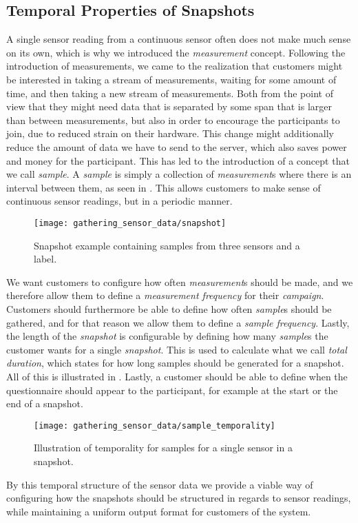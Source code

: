 \subsection{Temporal Properties of Snapshots}
\label{sec:temporal_properties_of_snapshots}

A single sensor reading from a continuous sensor often does not make much sense on its own, which is why we introduced the \emph{measurement} concept. Following the introduction of measurements, we came to the realization that customers might be interested in taking a stream of measurements, waiting for some amount of time, and then taking a new stream of measurements. Both from the point of view that they might need data that is separated by some span that is larger than between measurements, but also in order to encourage the participants to join, due to reduced strain on their hardware. This change might additionally reduce the amount of data we have to send to the server, which also saves power and money for the participant. This has led to the introduction of a concept that we call \emph{sample}. A \emph{sample} is simply a collection of \emph{measurement}s where there is an interval between them, as seen in . This allows customers to make sense of continuous sensor readings, but in a periodic manner. 

\begin{figure}[!htbp]
    \centering
    \texttt{[image: gathering\_sensor\_data/snapshot]}
    \caption{Snapshot example containing samples from three sensors and a label.}
    \label{fig:snapshot_example_with_samples}
\end{figure}
\FloatBarrier

We want customers to configure how often \emph{measurement}s should be made, and we therefore allow them to define a \emph{measurement frequency} for their \emph{campaign}. Customers should furthermore be able to define how often \emph{sample}s should be gathered, and for that reason we allow them to define a \emph{sample frequency}. Lastly, the length of the \emph{snapshot} is configurable by defining how many \emph{sample}s the customer wants for a single \emph{snapshot}. This is used to calculate what we call \emph{total duration}, which states for how long samples should be generated for a snapshot. All of this is illustrated in . Lastly, a customer should be able to define when the questionnaire should appear to the participant, for example at the start or the end of a snapshot.

\begin{figure}[!htbp]
    \centering
    \texttt{[image: gathering\_sensor\_data/sample\_temporality]}
    \caption{Illustration of temporality for samples for a single sensor in a snapshot.}
    \label{fig:sample_temporality}
\end{figure}
\FloatBarrier

By this temporal structure of the sensor data we provide a viable way of configuring how the snapshots should be structured in regards to sensor readings, while maintaining a uniform output format for customers of the system.
